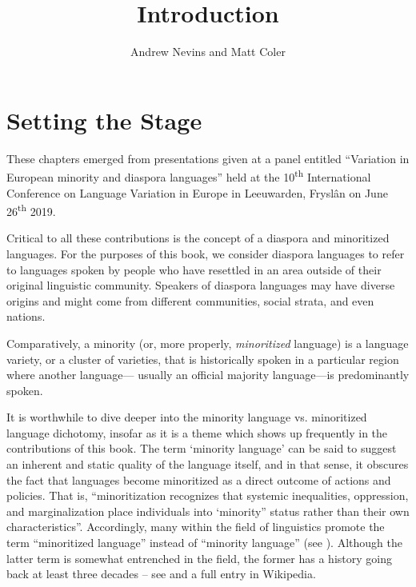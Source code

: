 \documentclass[output=paper]{langscibook}
\author{Andrew Nevins\affiliation{University College London} and Matt Coler\affiliation{University of Groningen -- Campus Fryslân}
}
\title{Introduction}
\begin{document}
\maketitle

\section{Setting the Stage}
These chapters emerged from presentations given at a panel entitled ``Variation in European minority and diaspora languages'' held at the 10\textsuperscript{th} International Conference on Language Variation in Europe in Leeuwarden, Fryslân on June 26\textsuperscript{th} 2019.

Critical to all these contributions is the concept of a diaspora and minoritized languages. For the purposes of this book, we consider diaspora languages to refer to languages spoken by people who have resettled in an area outside of their original linguistic community. Speakers of diaspora languages may have diverse origins and might come from different communities, social strata, and even nations. 

Comparatively, a minority (or, more properly, \textit{minoritized} language) is a language variety, or a cluster of varieties, that is historically spoken in a particular region where another language— usually an official majority language—is predominantly spoken.

It is worthwhile to dive deeper into the minority language vs. minoritized language dichotomy, insofar as it is a theme which shows up frequently in the contributions of this book. The term ‘minority language’ can be said to
suggest an inherent and static quality of the language itself, and in that sense, it obscures the fact that languages become minoritized as a direct outcome of actions and policies. That is, ``minoritization recognizes that systemic inequalities, oppression, and marginalization place individuals into ‘minority” status rather than their own characteristics''\citep{sotto2019time}. Accordingly, many within the field of linguistics promote the term ``minoritized language'' instead of ``minority language'' (see \citealt[Ch. 1]{nevins2022minoritized}). Although the latter term is somewhat entrenched in the field, the former has a history going back at least three decades -- see \citealt{py1989minorisation} and a full entry in Wikipedia.
\end{document}
